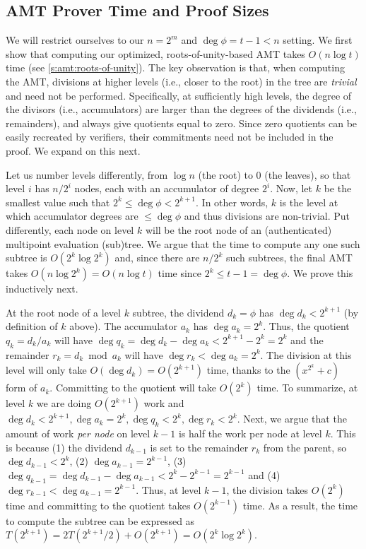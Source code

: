 \subsection{AMT Prover Time and Proof Sizes}
\label{s:amt:proof-time-and-sizes}
We will restrict ourselves to our $n = 2^m$ and $\deg{\phi}=t-1 < n$ setting.
We first show that computing our optimized, roots-of-unity-based AMT takes $O(n\log{t})$ time (see \cref{s:amt:roots-of-unity}).
The key observation is that, when computing the AMT, divisions at higher levels (i.e., closer to the root) in the tree are \textit{trivial} and need not be performed.
Specifically, at sufficiently high levels, the degree of the divisors (i.e., accumulators) are larger than the degrees of the dividends (i.e., remainders), and always give quotients equal to zero.
Since zero quotients can be easily recreated by verifiers, their commitments need not be included in the proof.
We expand on this next.

Let us number levels differently, from $\log{n}$ (the root) to 0 (the leaves), so that level $i$ has $n/2^i$ nodes, each with an accumulator of degree $2^i$.
Now, let $k$ be the smallest value such that $2^k \le \deg{\phi} < 2^{k+1}$.
In other words, $k$ is the level at which accumulator degrees are $\le \deg{\phi}$ and thus divisions are non-trivial.
Put differently, each node on level $k$ will be the root node of an (authenticated) multipoint evaluation (sub)tree.
We argue that the time to compute any one such subtree is $O(2^k \log{2^k})$ and, since there are $n/2^k$ such subtrees, the final AMT takes $O(n\log{2^k}) = O(n\log{t})$ time since $2^k\le t-1=\deg{\phi}$.
We prove this inductively next.

At the root node of a level $k$ subtree, the dividend $d_k = \phi$ has $\deg{d_k} < 2^{k+1}$ (by definition of $k$ above).
The accumulator $a_k$ has $\deg{a_k} = 2^k$.
Thus, the quotient $q_k = d_k/a_k$ will have $\deg{q_k} = \deg{d_k}-\deg{a_k}< 2^{k+1} - 2^k = 2^k$ and the remainder $r_k = d_k \bmod a_k$ will have $\deg{r_k} < \deg{a_k} = 2^k$.
The division at this level will only take $O(\deg{d_k})=O(2^{k+1})$ time, thanks to the $(x^{2^k} + c)$ form of $a_k$.
Committing to the quotient will take $O(2^{k})$ time.
To summarize, at level $k$ we are doing $O(2^{k+1})$ work and $\deg{d_k} < 2^{k+1}, \deg{a_k} = 2^k, \deg{q_k} < 2^k, \deg{r_k} < 2^k$.
Next, we argue that the amount of work \textit{per node} on level $k-1$ is half the work per node at level $k$.
This is because (1) the dividend $d_{k-1}$ is set to the remainder $r_k$ from the parent, so $\deg{d_{k-1}} < 2^k$, (2) $\deg{a_{k-1}}=2^{k-1}$, (3) $\deg{q_{k-1}} = \deg{d_{k-1}}-\deg{a_{k-1}}<2^k-2^{k-1}=2^{k-1}$ and (4) $\deg{r_{k-1}} < \deg{a_{k-1}}=2^{k-1}$.
Thus, at level $k-1$, the division takes $O(2^k)$ time and committing to the quotient takes $O(2^{k-1})$ time. 
As a result, the time to compute the subtree can be expressed as $T(2^{k+1}) = 2T(2^{k+1} / 2) + O(2^{k+1}) = O(2^{k}\log{2^{k}})$.

